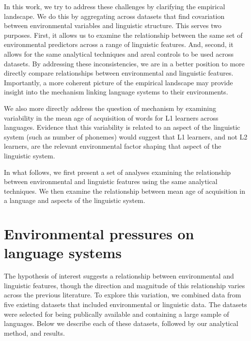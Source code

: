\documentclass[10pt,letterpaper]{article}
\begin{document}
In this work, we try to address these challenges by clarifying the empirical landscape. We do this by aggregating across datasets that find covariation between environmental variables and linguistic structure. This serves two purposes. First, it allows us to examine the relationship between the same set of environmental predictors across a range of linguistic features. And, second, it allows for the same analytical techniques and areal controls to be used across datasets. By addressing these inconsistencies, we are in a better position to more directly compare relationships between environmental and linguistic features. Importantly, a more coherent picture of the empirical landscape may provide insight into the mechanism linking language systems to their environments.

We also more directly address the question of mechanism by examining variability in the mean age of acquisition of words for L1 learners across languages. Evidence that this variability is related to an aspect of the linguistic system (such as number of phonemes) would suggest that L1 learners, and not L2 learners, are the relevant environmental factor shaping that aspect of the linguistic system. 

In what follows, we first present a set of analyses examining the relationship between environmental and linguistic features using the same analytical techniques.  We then examine the relationship between mean age of acquisition in a language and aspects of the linguistic system.

 
\section{Environmental pressures on language systems}
The hypothesis of interest suggests a relationship between environmental and linguistic features, though the direction  and magnitude of this relationship varies across the previous literature. To explore this variation, we combined data from five existing datasets that included environmental or linguistic data. The datasets were selected for being publically available and containing a large sample of languages. Below we describe each of these datasets, followed by our analytical method, and results.
\end{document}
